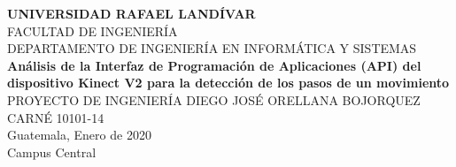 \begin{titlepage}
\begin{center}
{\LARGE \textbf{UNIVERSIDAD RAFAEL LAND\'IVAR}}\\[0.1cm]
{\normalsize FACULTAD DE INGENIER\'IA}\\[0.1cm]
{\normalsize DEPARTAMENTO DE INGENIER\'IA EN INFORM\'ATICA Y SISTEMAS}\\[4cm]
{\huge \textbf{An\'alisis de
la Interfaz de Programaci\'on de Aplicaciones (API) del dispositivo Kinect V2 para la detecci\'on de
los pasos de un movimiento}}\\[0.1cm]
{\LARGE PROYECTO DE INGENIER\'IA}
\vfill
DIEGO JOS\'E ORELLANA BOJORQUEZ\\[0.1cm]
CARN\'E 10101-14\\[2cm]
Guatemala, Enero de 2020\\[0.1cm]
Campus Central
\afterpage{\blankpage}
\end{center}
\end{titlepage}
